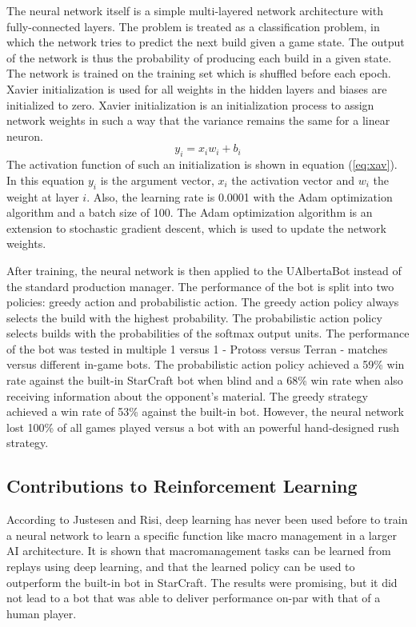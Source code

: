 The neural network itself is a simple multi-layered network architecture with fully-connected layers. The problem is treated as a classification problem, in which the network tries to predict the next build given a game state. The output of the network is thus the probability of producing each build in a given state. The network is trained on the training set which is shuffled before each epoch. Xavier initialization is used for all weights in the hidden layers and biases are initialized to zero. Xavier initialization is an initialization process to assign network weights in such a way that the variance remains the same for a linear neuron\citep{glorot2010understanding}.
\begin{equation} \label{eq:xav}
y_i = x_iw_i + b_i
\end{equation}
The activation function of such an initialization is shown in equation (\ref{eq:xav}). In this equation $y_i$ is the argument vector, $x_i$ the activation vector and $w_i$ the weight at layer $i$.
Also, the learning rate is 0.0001 with the Adam optimization algorithm and a batch size of 100. The Adam optimization algorithm is an extension to stochastic gradient descent, which is used to update the network weights\citep{kingma2014adam}.

After training, the neural network is then applied to the UAlbertaBot instead of the standard production manager. The performance of the bot is split into two policies: greedy action and probabilistic action. The greedy action policy always selects the build with the highest probability. The probabilistic action policy selects builds with the probabilities of the softmax output units. The performance of the bot was tested in multiple 1 versus 1 - Protoss versus Terran - matches versus different in-game bots. The probabilistic action policy achieved a 59\% win rate against the built-in StarCraft bot when blind and a 68\% win rate when also receiving information about the opponent's material. The greedy strategy achieved a win rate of 53\% against the built-in bot. However, the neural network lost 100\% of all games played versus a bot with an powerful hand-designed rush strategy.

\subsection{Contributions to Reinforcement Learning}

According to Justesen and Risi\citep{justesen2017learning}, deep learning has never been used before to train a neural network to learn a specific function like macro management in a larger AI architecture. It is shown that macromanagement tasks can be learned from replays using deep learning, and that the learned policy can be used to outperform the built-in bot in StarCraft. The results were promising, but it did not lead to a bot that was able to deliver performance on-par with that of a human player.

